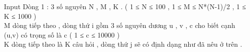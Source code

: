 Input
Dòng 1 : 3 số nguyên N , M , K . ( 1 ≤ N ≤ 100 , 1 ≤ M ≤ N*(N-1)/2  , 1 ≤ K ≤ 1000 )   
\\   M dòng tiếp theo , dòng thứ i gồm 3 số nguyên dương u , v , c cho biết cạnh (u,v) có trọng số là c ( 1 ≤ c ≤ 10000 )   
\\   K dòng tiếp theo là K câu hỏi , dòng thứ j sẽ có định dạng như đã nêu ở trên .   
\\